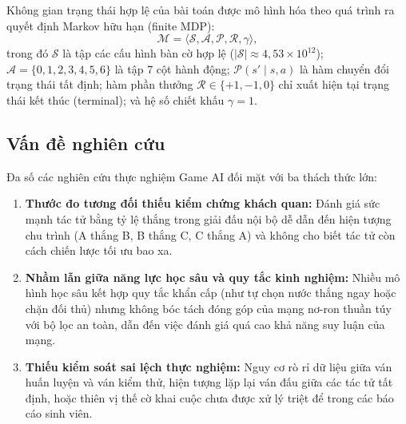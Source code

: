 \documentclass[11pt, a4paper]{article}
\begin{document}
Không gian trạng thái hợp lệ của bài toán được mô hình hóa theo quá trình ra quyết định Markov hữu hạn (finite MDP):
\begin{equation}
\mathcal{M} = \langle \mathcal{S}, \mathcal{A}, \mathcal{P}, \mathcal{R}, \gamma \rangle,
\end{equation}
trong đó $\mathcal{S}$ là tập các cấu hình bàn cờ hợp lệ ($|\mathcal{S}| \approx 4{,}53 \times 10^{12}$); $\mathcal{A} = \{0, 1, 2, 3, 4, 5, 6\}$ là tập 7 cột hành động; $\mathcal{P}(s' \mid s, a)$ là hàm chuyển đổi trạng thái tất định; hàm phần thưởng $\mathcal{R} \in \{+1, -1, 0\}$ chỉ xuất hiện tại trạng thái kết thúc (terminal); và hệ số chiết khấu $\gamma = 1$.

\subsection{Vấn đề nghiên cứu}
Đa số các nghiên cứu thực nghiệm Game AI đối mặt với ba thách thức lớn:
\begin{enumerate}
    \item \textbf{Thước đo tương đối thiếu kiểm chứng khách quan:} Đánh giá sức mạnh tác tử bằng tỷ lệ thắng trong giải đấu nội bộ dễ dẫn đến hiện tượng chu trình (A thắng B, B thắng C, C thắng A) và không cho biết tác tử còn cách chiến lược tối ưu bao xa.
    \item \textbf{Nhầm lẫn giữa năng lực học sâu và quy tắc kinh nghiệm:} Nhiều mô hình học sâu kết hợp quy tắc khẩn cấp (như tự chọn nước thắng ngay hoặc chặn đối thủ) nhưng không bóc tách đóng góp của mạng nơ-ron thuần túy với bộ lọc an toàn, dẫn đến việc đánh giá quá cao khả năng suy luận của mạng.
    \item \textbf{Thiếu kiểm soát sai lệch thực nghiệm:} Nguy cơ rò rỉ dữ liệu giữa ván huấn luyện và ván kiểm thử, hiện tượng lặp lại ván đấu giữa các tác tử tất định, hoặc thiên vị thế cờ khai cuộc chưa được xử lý triệt để trong các báo cáo sinh viên.
\end{enumerate}
\end{document}
